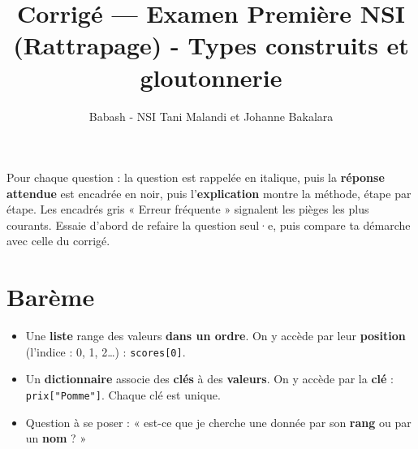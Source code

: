 \documentclass[addpoints, 11pt]{exam}
\title{Corrigé --- Examen Première NSI (Rattrapage) - Types construits et gloutonnerie}
\author{Babash - NSI Tani Malandi et Johanne Bakalara}
\date{}
\newcommand{\code}[1]{\texttt{#1}}
\DeclareRobustCommand{\_}{\textunderscore\allowbreak}
\begin{document}
\pagestyle{headandfoot}
\firstpageheader{}{}{}

\maketitle
\thispagestyle{headandfoot}

\begin{astuce}
Pour chaque question : la question est rappelée en italique, puis la \textbf{réponse attendue} est encadrée en noir, puis l'\textbf{explication} montre la méthode, étape par étape.
Les encadrés gris « Erreur fréquente » signalent les pièges les plus courants. Essaie d'abord de refaire la question seul·e, puis compare ta démarche avec celle du corrigé.
\end{astuce}

\section*{Barème}
\begin{center}
  \gradetable[h]
\end{center}

\begin{astuce}
\begin{itemize}
  \item Une \textbf{liste} range des valeurs \textbf{dans un ordre}. On y accède par leur \textbf{position} (l'indice : 0, 1, 2\dots) : \code{scores[0]}.
  \item Un \textbf{dictionnaire} associe des \textbf{clés} à des \textbf{valeurs}. On y accède par la \textbf{clé} : \code{prix["Pomme"]}. Chaque clé est unique.
  \item Question à se poser : « est-ce que je cherche une donnée par son \textbf{rang} ou par un \textbf{nom} ? »
\end{itemize}
\end{astuce}
\end{document}
